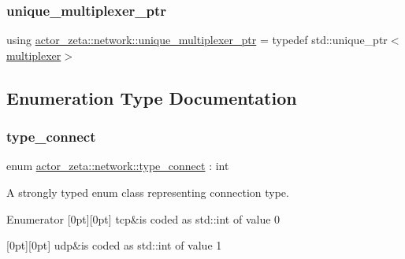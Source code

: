 \subsubsection{\texorpdfstring{unique\+\_\+multiplexer\+\_\+ptr}{unique\_multiplexer\_ptr}}
{\footnotesize\ttfamily using \hyperlink{namespaceactor__zeta_1_1network_aca954f31343c8d2d513bebe30f6f87b4}{actor\+\_\+zeta\+::network\+::unique\+\_\+multiplexer\+\_\+ptr} = typedef std\+::unique\+\_\+ptr$<$\hyperlink{structactor__zeta_1_1network_1_1multiplexer}{multiplexer}$>$}



\subsection{Enumeration Type Documentation}
\mbox{\label{namespaceactor__zeta_1_1network_a4046d5cb8c42554d5787ef4f0d5e3094}} 
\subsubsection{\texorpdfstring{type\+\_\+connect}{type\_connect}}
{\footnotesize\ttfamily enum \hyperlink{namespaceactor__zeta_1_1network_a4046d5cb8c42554d5787ef4f0d5e3094}{actor\+\_\+zeta\+::network\+::type\+\_\+connect} \+: int\hspace{0.3cm}{\ttfamily [strong]}}



A strongly typed enum class representing connection type. 

\begin{DoxyEnumFields}{Enumerator}
[0pt][0pt]{}\mbox{\label{namespaceactor__zeta_1_1network_a4046d5cb8c42554d5787ef4f0d5e3094ae20bb202b1d5537b1415e3263a37ed78}} 
tcp&is coded as std\+::int of value 0 \\
\hline

[0pt][0pt]{}\mbox{\label{namespaceactor__zeta_1_1network_a4046d5cb8c42554d5787ef4f0d5e3094a84864c1fe095359bc9c5ac068e24e781}} 
udp&is coded as std\+::int of value 1 \\
\hline

\end{DoxyEnumFields}
